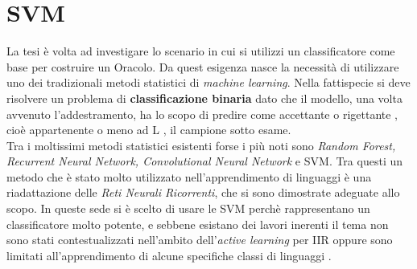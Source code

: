 
\chapter{SVM} %
\label{cap:cinque}
La tesi è volta ad investigare lo scenario in cui si utilizzi un classificatore come base per costruire un Oracolo. Da quest esigenza nasce la necessità di utilizzare uno dei tradizionali metodi statistici di \textit{machine learning}. Nella fattispecie si deve risolvere un problema di \textbf{classificazione binaria} dato che il modello, una volta avvenuto l'addestramento, ha lo scopo di predire come accettante o rigettante , cioè appartenente o meno ad \ac{L} , il campione sotto esame.\\
Tra i moltissimi metodi statistici esistenti forse i più noti sono \textit{Random Forest, Recurrent Neural Network, Convolutional Neural Network} e \ac{SVM}. Tra questi un metodo che è stato molto utilizzato nell'apprendimento di linguaggi è una riadattazione delle \textit{Reti Neurali Ricorrenti}, che si sono dimostrate adeguate allo scopo. In queste sede si è scelto di usare le \ac{SVM} perchè rappresentano un classificatore molto potente, e sebbene esistano dei lavori inerenti il tema \cite{Kontorovich09} non sono stati contestualizzati nell'ambito dell'\textit{active learning} per \ac{IIR} oppure sono limitati all'apprendimento di alcune specifiche classi di linguaggi \cite{Cortes08} \cite{Clark06} \cite{Clark11}.

